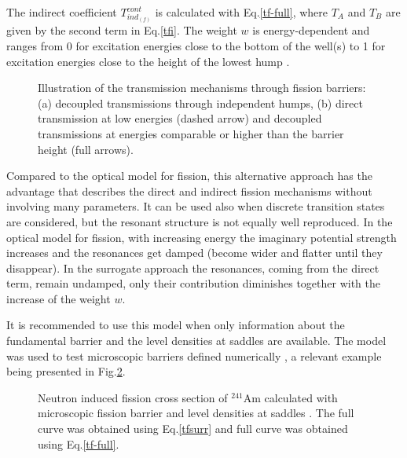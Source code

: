 \documentclass[twocolumn,amsmath,amssymb,10pt,groupedaddress,a4paper]{revtex4}
\begin{document}
The indirect coefficient $T_{ind_{(f)}}^{cont}$ is calculated with Eq.\ref{tf-full}, where $T_A$ and $T_B$ are given by the
second term in Eq.\ref{tfi}.
The weight $w$ is energy-dependent and ranges from 0 for excitation energies close to the
bottom of the well(s) to 1 for excitation energies close to the height of the lowest hump
\cite{Sin:07}.
%
\begin{figure}[htbp]
\caption{Illustration of the transmission mechanisms through fission barriers:
(a) decoupled transmissions through independent humps,
(b) direct transmission at low energies (dashed arrow) and decoupled transmissions at
energies comparable or higher than the barrier height (full arrows).}
\label{fis-ld0.eps}
\end{figure}
%
Compared to the optical model for fission, this alternative approach has the advantage that
describes the direct and indirect fission mechanisms without involving many parameters.
It can be used also when discrete transition states are considered, but the resonant
structure is not equally well reproduced. In the optical model for fission, with increasing
energy  the imaginary potential strength increases and the resonances get damped
(become wider and flatter until they disappear). In the surrogate approach the resonances,
coming from the direct term, remain undamped, only their contribution diminishes together
with the increase of the weight $w$.

It is recommended to use this model when only information about the fundamental barrier and
the level densities at saddles are available. The model was used to test microscopic
barriers defined numerically \cite{Sin:07}, a relevant example being presented in
Fig.\ref{am41-surr}.
%
\begin{figure}[htbp]
\caption{Neutron induced fission cross section of $^{241}$Am calculated with microscopic
fission barrier \cite{Goriely:07-mass} and level densities at saddles \cite{Goriely:07-ld}.
The full curve was obtained using Eq.\ref{tfsurr} and full curve was obtained using
Eq.\ref{tf-full}.}
\label{am41-surr}
\end{figure}
%


\end{document}
